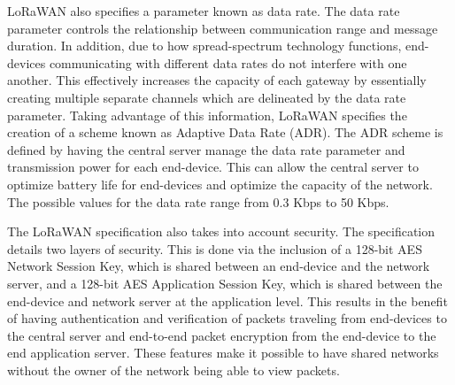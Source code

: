 LoRaWAN also specifies a parameter known as data rate. The data rate parameter controls the relationship between communication range and message duration. In addition, due to how spread-spectrum technology functions, end-devices communicating with different data rates do not interfere with one another. This effectively increases the capacity of each gateway by essentially creating multiple separate channels which are delineated by the data rate parameter. Taking advantage of this information, LoRaWAN specifies the creation of a scheme known as Adaptive Data Rate (ADR). The ADR scheme is defined by having the central server manage the data rate parameter and transmission power for each end-device. This can allow the central server to optimize battery life for end-devices and optimize the capacity of the network. The possible values for the data rate range from 0.3 Kbps to 50 Kbps.

The LoRaWAN specification also takes into account security. The specification details two layers of security. This is done via the inclusion of a 128-bit AES Network Session Key, which is shared between an end-device and the network server, and a 128-bit AES Application Session Key, which is shared between the end-device and network server at the application level. This results in the benefit of having authentication and verification of packets traveling from end-devices to the central server and end-to-end packet encryption from the end-device to the end application server. These features make it possible to have shared networks without the owner of the network being able to view packets.